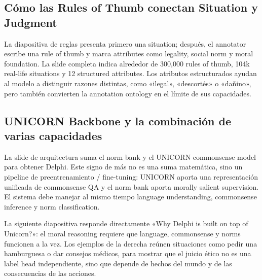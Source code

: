 
\subsection{Cómo las Rules of Thumb conectan Situation y Judgment}

La diapositiva de reglas presenta primero una situation; después, el annotator escribe una rule of thumb y marca attributes como legality, social norm y moral foundation. La slide completa indica alrededor de 300,000 rules of thumb, 104k real-life situations y 12 structured attributes. Los atributos estructurados ayudan al modelo a distinguir razones distintas, como «ilegal», «descortés» o «dañino», pero también convierten la annotation ontology en el límite de sus capacidades.


\subsection{UNICORN Backbone y la combinación de varias capacidades}

La slide de arquitectura suma el norm bank y el UNICORN commonsense model para obtener Delphi. Este signo de más no es una suma matemática, sino un pipeline de preentrenamiento / fine-tuning: UNICORN aporta una representación unificada de commonsense QA y el norm bank aporta morally salient supervision. El sistema debe manejar al mismo tiempo language understanding, commonsense inference y norm classification.


La siguiente diapositiva responde directamente «Why Delphi is built on top of Unicorn?»: el moral reasoning requiere que language, commonsense y norms funcionen a la vez. Los ejemplos de la derecha reúnen situaciones como pedir una hamburguesa o dar consejos médicos, para mostrar que el juicio ético no es una label head independiente, sino que depende de hechos del mundo y de las consecuencias de las acciones.

